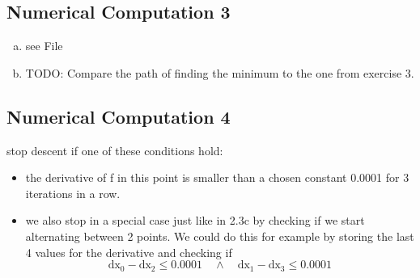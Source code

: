 \documentclass[12pt]{article}
\begin{document}
\subsection{Numerical Computation 3}
\begin{enumerate}[a)]
    \item 
        see File
    \item
        TODO: Compare the path of finding the minimum to the one from exercise 3.
\end{enumerate}


\subsection{Numerical Computation 4}
stop descent if one of these conditions hold:
\begin{itemize}
    \item 
        the derivative of f in this point is smaller than a chosen constant 0.0001 for 3 iterations in a row.
    \item
        we also stop in a special case just like in 2.3c by checking if we start alternating between 2 points. We could do this for example by storing the last 4 values for the derivative and checking if 
        $$ \text{dx}_0 - \text{dx}_2 \leq 0.0001 \quad \land \quad \text{dx}_1 - \text{dx}_3 \leq 0.0001 $$
\end{itemize}
\end{document}

